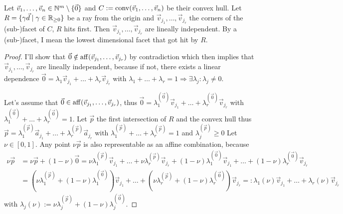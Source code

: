 \begin{lemma}
    \label{lemma:visible_facets_are_linearly_independent}
    Let $\vec v_1, \dots, \vec v_n \in \mathbb{N}^m \setminus\{\vec0\}$ and $C := \operatorname{conv}(\vec v_1, \dots, \vec v_n)$ be their convex hull. Let $R = \{\gamma \vec d \mid \gamma \in \mathbb{R}_{\geq 0}\}$ be a ray from the origin and $\vec v_{j_1}, \dots, \vec v_{j_r}$ the corners of the (sub-)facet of $C$, $R$ hits first. Then $\vec v_{j_1}, \dots, \vec v_{j_r}$ are lineally independent. By a (sub-)facet, I mean the lowest dimensional facet that got hit by $R$.
\end{lemma}
\begin{proof}
    I'll show that $\vec 0 \notin \operatorname{aff}(\vec v_{j_1}, \dots, \vec v_{j_r})$ by contradiction which then implies that $\vec v_{j_1}, \dots, \vec v_{j_r}$ are lineally independent, because if not, there exists a linear dependence $\vec 0 = \lambda_1\vec v_{j_1} + \dots + \lambda_r\vec v_{j_r}$ with $\lambda_1 + \dots + \lambda_r = 1 \Rightarrow\exists\lambda_j\colon\lambda_j \neq 0$. 
    
    Let's assume that $\vec 0 \in \operatorname{aff}(\vec v_{j_1}, \dots, \vec v_{j_r})$, thus $\vec 0 = \lambda^{(\vec 0)}_1 \vec v_{j_1} + \dots + \lambda^{(\vec 0)}_r \vec v_{j_r}$ with $\lambda^{(\vec 0)}_1 + \dots + \lambda^{(\vec 0)}_r = 1$. Let $\vec p$ the first intersection of $R$ and the convex hull thus $\vec p = \lambda^{(\vec p)}_1 \vec a_{j_1} + \dots + \lambda^{(\vec p)}_r \vec a_{j_r}$ with $\lambda^{(\vec p)}_1 + \dots + \lambda^{(\vec p)}_r = 1$ and $\lambda^{(\vec p)}_j \geq 0$ Let $\nu \in [0, 1]$. Any point $\nu\vec p$ is also representable as an affine combination, because
    \begin{align*}
        \nu \vec p &= \nu \vec p + (1-\nu)\vec 0 = \nu\lambda^{(\vec p)}_1 \vec v_{j_1} + \dots + \nu\lambda^{(\vec p)}_r \vec v_{j_r} + (1-\nu)\lambda^{(\vec 0)}_1 \vec v_{j_1} + \dots + (1-\nu)\lambda^{(\vec 0)}_r \vec v_{j_r}\\
        &=(\nu\lambda^{(\vec p)}_1 + (1-\nu)\lambda^{(\vec 0)}_1)\vec v_{j_1} + \dots + (\nu\lambda^{(\vec p)}_r + (1-\nu)\lambda^{(\vec 0)}_r)\vec v_{j_r} =: \lambda_1(\nu)\vec v_{j_1} + \dots + \lambda_r(\nu)\vec v_{j_r}
    \end{align*}
    with $\lambda_j(\nu) := \nu\lambda^{(\vec p)}_j + (1-\nu)\lambda^{(\vec 0)}_j$.


\end{proof}
